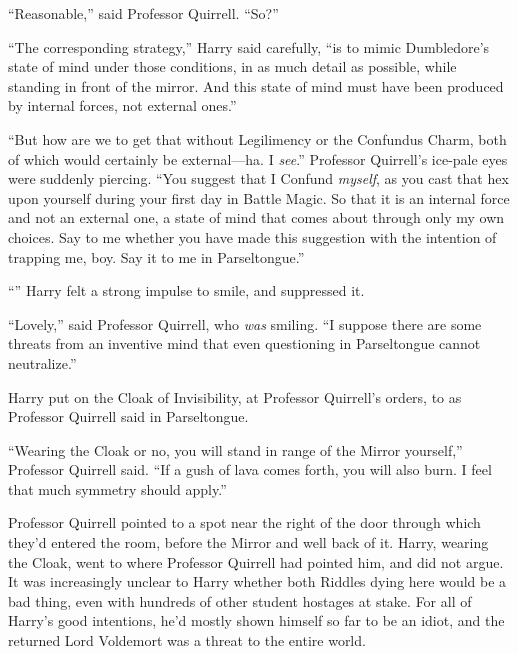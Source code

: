 “Reasonable,” said Professor Quirrell. “So?”

“The corresponding strategy,” Harry said carefully, “is to mimic Dumbledore’s state of mind under those conditions, in as much detail as possible, while standing in front of the mirror. And this state of mind must have been produced by internal forces, not external ones.”

“But how are we to get that without Legilimency or the Confundus Charm, both of which would certainly be external—ha. I \emph{see}.” Professor Quirrell’s ice-pale eyes were suddenly piercing. “You suggest that I Confund \emph{myself}, as you cast that hex upon yourself during your first day in Battle Magic. So that it is an internal force and not an external one, a state of mind that comes about through only my own choices. Say to me whether you have made this suggestion with the intention of trapping me, boy. Say it to me in Parseltongue.”

“” Harry felt a strong impulse to smile, and suppressed it.

“Lovely,” said Professor Quirrell, who \emph{was} smiling. “I suppose there are some threats from an inventive mind that even questioning in Parseltongue cannot neutralize.”

\later

Harry put on the Cloak of Invisibility, at Professor Quirrell’s orders, to  as Professor Quirrell said in Parseltongue.

“Wearing the Cloak or no, you will stand in range of the Mirror yourself,” Professor Quirrell said. “If a gush of lava comes forth, you will also burn. I feel that much symmetry should apply.”

Professor Quirrell pointed to a spot near the right of the door through which they’d entered the room, before the Mirror and well back of it. Harry, wearing the Cloak, went to where Professor Quirrell had pointed him, and did not argue. It was increasingly unclear to Harry whether both Riddles dying here would be a bad thing, even with hundreds of other student hostages at stake. For all of Harry’s good intentions, he’d mostly shown himself so far to be an idiot, and the returned Lord Voldemort was a threat to the entire world.

